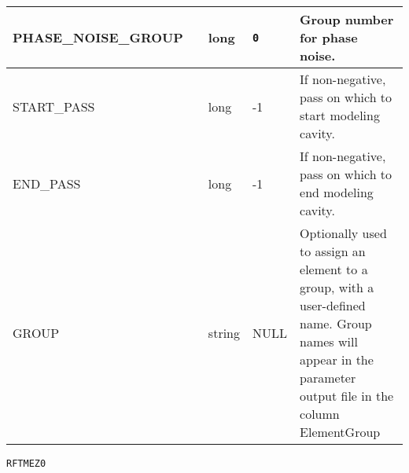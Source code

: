 \begin{tabular}{|l|l|l|l|p{\descwidth}|}
PHASE\_NOISE\_GROUP &  & long &  \verb|0| & Group number for phase noise.  \\ \hline 
START\_PASS &  & long &   -1              & If non-negative, pass on which to start modeling cavity.  \\ \hline 
END\_PASS &  & long &   -1              & If non-negative, pass on which to end modeling cavity.  \\ \hline 
GROUP &  & string & NULL & Optionally used to assign an element to a group, with a user-defined name.  Group names will appear in the parameter output file in the column ElementGroup  \\ \hline 
\end{tabular}

\vspace*{0.5in}

\vspace*{0.5in}

\newpage
\begin{center}{\Large\verb|RFTMEZ0|}\end{center}
